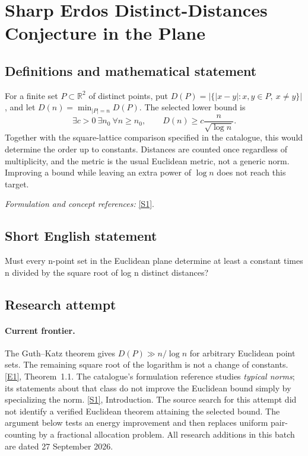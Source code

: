 \documentclass[11pt,a4paper]{article}
\newcommand{\R}{\mathbb{R}}
\newcommand{\sref}[2]{\hyperlink{source:#1:#2}{[S#2]}}
\newcommand{\eref}[2]{\hyperlink{extra:#1:#2}{[E#2]}}
\newif\ifshowcatalogue
\newcommand{\cataloguescope}[1]{\ifshowcatalogue
 \paragraph{Exact scope in the supplied catalogue.}
 \begin{quote}\small #1\end{quote}\fi}
\numberwithin{equation}{section}
\begin{document}
\setcounter{section}{0}
\clearpage
\section*{\texorpdfstring{Sharp Erdos Distinct-Distances Conjecture in the Plane}{Sharp Erdos Distinct-Distances Conjecture in the Plane}}\label{30006795}
\subsection{Definitions and mathematical statement}
For a finite set $P\subset\R^2$ of distinct points, put
$D(P)=|\{|x-y|:x,y\in P,\ x\ne y\}|$, and let
$D(n)=\min_{|P|=n}D(P)$. The selected lower bound is
\[
 \exists c>0\ \exists n_0\ \forall n\ge n_0,
 \qquad D(n)\ge c\frac{n}{\sqrt{\log n}}.
\]
Together with the square-lattice comparison specified in the catalogue, this would determine the order up to constants. Distances are counted once regardless of multiplicity, and the metric is the usual Euclidean metric, not a generic norm. Improving a bound while leaving an extra power of $\log n$ does not reach this target.
\par\smallskip\textit{Formulation and concept references:} \sref{30006795}{1}.
\cataloguescope{Let D(n) be the minimum, over all sets of n distinct points in the Euclidean plane, of the number of distinct pairwise distances determined by the set. Prove D(n) = Omega(n/sqrt(log n)), matching up to a constant factor the square-lattice construction D(n) = O(n/sqrt(log n)).}
\subsection{Short English statement}
Must every n-point set in the Euclidean plane determine at least a constant times n divided by the square root of log n distinct distances?
\subsection{Research attempt}

\paragraph{Current frontier.}
The Guth--Katz theorem gives $D(P)\gg n/\log n$ for arbitrary Euclidean
point sets. The remaining square root of the logarithm is not a change
of constants. \eref{30006795}{1}, Theorem~1.1.
The catalogue's formulation reference studies \emph{typical norms}; its
statements about that class do not improve the Euclidean bound simply by
specializing the norm. \sref{30006795}{1}, Introduction. The source search for
this attempt did not identify a verified Euclidean theorem attaining the
selected bound. The argument below tests an energy improvement and then
replaces uniform pair-counting by a fractional allocation problem.
All research additions in this batch are dated 27 September 2026.
\end{document}
